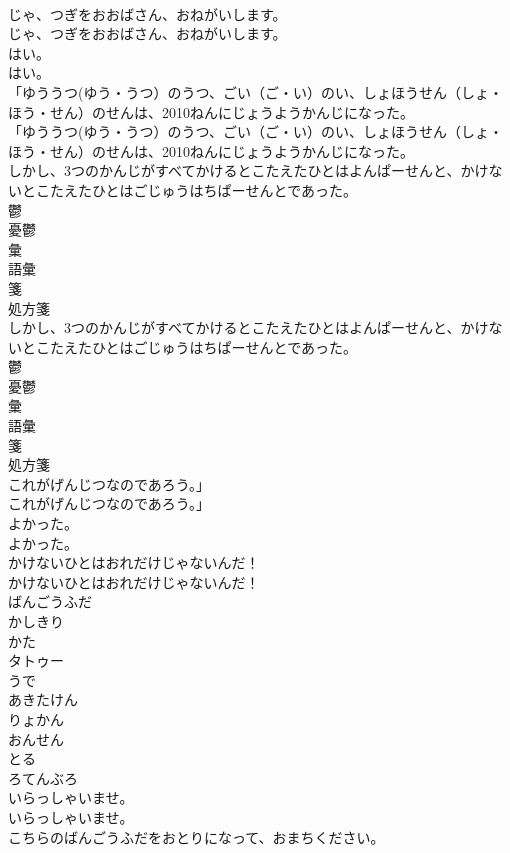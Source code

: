 \documentclass[8pt]{extreport}
\begin{document}
\begin{CJK}{UTF8}{min}
\\	じゃ、つぎをおおばさん、おねがいします。
\\	じゃ、つぎをおおばさん、おねがいします。
\\	はい。
\\	はい。
\\	「ゆううつ(ゆう・うつ）のうつ、ごい（ご・い）のい、しょほうせん（しょ・ほう・せん）のせんは、2010ねんにじょうようかんじになった。
\\	「ゆううつ(ゆう・うつ）のうつ、ごい（ご・い）のい、しょほうせん（しょ・ほう・せん）のせんは、2010ねんにじょうようかんじになった。
\\	しかし、3つのかんじがすべてかけるとこたえたひとはよんぱーせんと、かけないとこたえたひとはごじゅうはちぱーせんとであった。
\\	鬱 
\\	憂鬱 
\\	彙 
\\	語彙 
\\	箋 
\\	処方箋 
\\	しかし、3つのかんじがすべてかけるとこたえたひとはよんぱーせんと、かけないとこたえたひとはごじゅうはちぱーせんとであった。
\\	鬱 
\\	憂鬱 
\\	彙 
\\	語彙 
\\	箋 
\\	処方箋 
\\	これがげんじつなのであろう。」
\\	これがげんじつなのであろう。」
\\	よかった。
\\	よかった。
\\	かけないひとはおれだけじゃないんだ！
\\	かけないひとはおれだけじゃないんだ！
\\	ばんごうふだ
\\	かしきり
\\	かた
\\	タトゥー
\\	うで
\\	あきたけん
\\	りょかん
\\	おんせん
\\	とる
\\	ろてんぶろ
\\	いらっしゃいませ。
\\	いらっしゃいませ。
\\	こちらのばんごうふだをおとりになって、おまちください。

\end{CJK}
\end{document}
